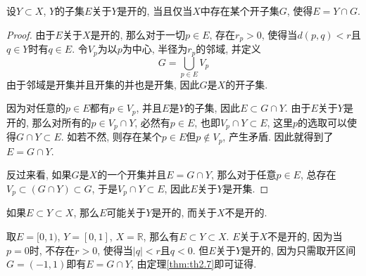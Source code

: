 \documentclass[cn,12pt,math=mtpro2,citestyle=gb7714-2015,bibstyle=gb7714-2015,twocol]{elegantbook}
\newcommand{\R}{\mathbb{R}}
\begin{document}
\begin{theorem}\label{thm:th2.7}
  设$Y\subset X$, $Y$的子集$E$关于$Y$是开的, 当且仅当$X$中存在某个开子集$G$, 使得$E=Y\cap G$.
\end{theorem}
\begin{proof}
  由于$E$关于$X$是开的, 那么对于一切$ p\in E$, 存在$r_p>0$, 使得当$d(p,q)<r$且$q\in Y$时有$q\in E$. 令$V_p$为以$p$为中心, 半径为$r_p$的邻域, 并定义
  $$G=\bigcup_{p\in E}V_p$$
  由于邻域是开集并且开集的并也是开集, 因此$G$是$X$的开子集.

  因为对任意的$p\in E$都有$p \in V_p$, 并且$E$是$Y$的子集, 因此$E\subset G\cap Y$. 由于$E$关于$Y$是开的, 那么对所有的$ p\in V_p\cap Y$, 必然有$p\in E$, 也即$V_p\cap Y\subset E$, 这里$p$的选取可以使得$G\cap Y\subset E$. 如若不然, 则存在某个$p \in E$但$p\notin V_p$, 产生矛盾. 因此就得到了$E=G\cap Y$.

  反过来看, 如果$G$是$X$的一个开集并且$E=G\cap Y$, 那么对于任意$p \in E$, 总存在$ V_p\subset (G\cap Y)\subset G$, 于是$V_p\cap Y\subset E$, 因此$E$关于$Y$是开集.

\end{proof}
\begin{example}\label{ex222}
如果$E\subset Y\subset X$, 那么$E$可能关于$Y$是开的, 而关于$X$不是开的.

取$E=[0,1)$, $Y=[0,1]$, $X=\R$, 那么有$E\subset Y\subset X$. $E$关于$X$不是开的, 因为当$p=0$时, 不存在$r>0$, 使得当$|q|<r$且$q<0$. 但$E$关于$Y$是开的, 因为只需取开区间$G=(-1,1)$即有$E=G\cap Y$, 由定理\ref{thm:th2.7}即可证得.
\end{example}
\end{document}

